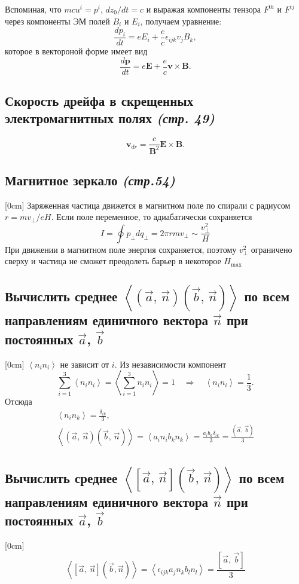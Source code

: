 \documentclass[a4paper,12pt]{article}
\begin{document}
Вспоминая, что $mcu^i=p^i$, $dz_0 /dt=c$ и выражая компоненты тензора $F^{0i}$ 
и $F^{ij}$ через компоненты ЭМ полей $B_i$ и $E_i$, получаем уравнение:
 \[
\frac{dp_i}{dt}=eE_i+\frac{e}{c}\epsilon_{ijk}v_jB_k
,\] 
которое в вектороной форме имеет вид
\[
\frac{d\mathbf{p}}{dt}=e \mathbf{E}+\frac{e}{c}\mathbf{v} \times
\mathbf{B} 
.\] 
\subsection{Скорость дрейфа в скрещенных электромагнитных полях \emph{(стр. 49)}}
\[
	\mathbf{v}_{dr}=\frac{c}{\mathbf{B}^2}\mathbf{E}\times\mathbf{B}
.\] 
\subsection{Магнитное зеркало \emph{(стр.54)}}
[0cm]
Заряженная частица движется в магнитном поле по спирали с радиусом
$r=mv_{\bot}/eH$. Если поле переменное, то адиабатически сохраняется 
\[I=\oint p_{\bot} dq_{\bot}=2\pi r m v_{\bot}\sim \frac{v_{\bot}^2}{H}\]
При движении в магнитном поле энергия сохраняется, поэтому $v_{\bot}^2$
ограничено сверху и частица не сможет преодолеть барьер в некоторое $H_{\max}$
\subsection{Вычислить среднее $\left<\left(\vec{a},\,\vec{n}\right)
\left( \vec{b},\,\vec{n} \right) \right>$ по всем направлениям единичного
вектора $\vec{n}$ при постоянных  $\vec{a}$, $\vec{b}$}
[0cm]
$\left< n_i n_i\right>$ не зависит от $i$. Из независимости компонент 
\[
\sum_{i=1}^3\left< n_i n_i\right>=\left<\sum_{i=1}^3 n_i n_i\right>=1
\quad \Rightarrow \quad \left< n_i n_i\right>=\frac{1}{3}.
\]
Отсюда 
\begin{gather*}
	\left< n_i n_k\right>=\frac{\delta_{ik}}{3},\\
	\left<\left(\vec{a},\,\vec{n}\right)
\left(\vec{b}
,\,\vec{n}\right)\right>=\left< a_i n_i b_k n_k\right>=\frac{a_i b_k \delta_{ik}}{3}=
\frac{\left(\vec{a},\,\vec{b}\right)}{3}
\end{gather*}
\subsection{Вычислить среднее $\left<\left[\vec{a},\,\vec{n}\right]
\left( \vec{b},\,\vec{n} \right) \right>$ по всем направлениям единичного
вектора $\vec{n}$ при постоянных  $\vec{a}$, $\vec{b}$}
[0cm]
\[
	\left<[\vec{a},\,\vec{n}]\left(\vec{b},\vec{n}\right)\right>=\left<
	\epsilon_{ijk}
	a_j n_k b_l n_l\right>=\frac{\left[\vec{a},\,\vec{b}\right]}{3}
\]
\end{document}
